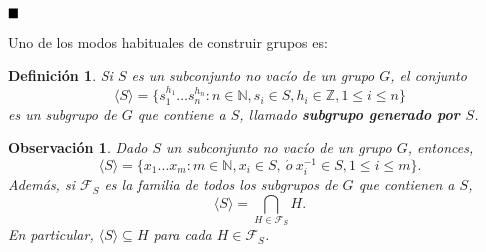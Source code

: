 \documentclass[12pt]{article}
\newtheorem{definition}[theorem]{Definición}
\newtheorem{observation}{Observación}[theorem]
\begin{document}
$\hfill \blacksquare$

Uno de los modos habituales de construir grupos es: 

\begin{definition}Si $S$ es un subconjunto no vacío de un grupo $G$, el conjunto $$\langle S \rangle = \lbrace s_1^{h_1} \ldots s_n^{h_n}: n \in \mathbb{N}, s_i \in S, h_i \in \mathbb{Z}, 1 \leq i \leq n \rbrace$$ es un subgrupo de $G$ que contiene a $S$, llamado \textbf{subgrupo generado por $S$}.
\end{definition}

\begin{observation}Dado $S$ un subconjunto no vacío de un grupo $G$, entonces, $$\langle S \rangle = \lbrace x_1 \ldots x_m: m \in \mathbb{N}, x_i \in S,~\acute{o}~ x_i^{-1} \in S, 1 \leq i \leq m \rbrace.$$ Además, si $\mathcal{F}_S$ es la familia de todos los subgrupos de $G$ que contienen a $S$, $$\langle S \rangle = \bigcap_{H \in \mathcal{F}_S} H.$$ En particular, $\langle S \rangle \subseteq H$ para cada $H \in \mathcal{F}_S$.
\end{observation}
\end{document}
